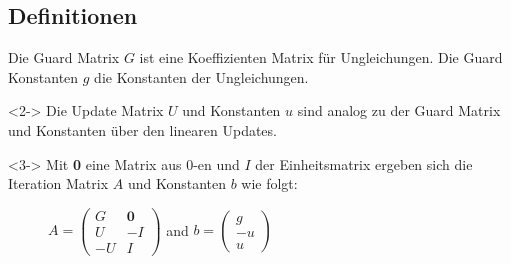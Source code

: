 \subsection{Definitionen}

\begin{frame}
	\begin{definition}
		Die Guard Matrix $G$ ist eine Koeffizienten Matrix f\"ur Ungleichungen. Die Guard Konstanten $g$ die Konstanten der Ungleichungen.
	\end{definition}
	\begin{definition}<2->
		Die Update Matrix $U$ und Konstanten $u$ sind analog zu der Guard Matrix und Konstanten über den linearen Updates.
	\end{definition}
	\begin{definition}<3->
		Mit \textbf{0} eine Matrix aus 0-en und $I$ der Einheitsmatrix ergeben sich die Iteration Matrix $A$ und Konstanten $b$ wie folgt:
		\vspace*{-1em}
		\begin{figure}[H]
			\centering
			$A = \begin{pmatrix} G & \textbf{0} \\ U & -I \\ -U & I \end{pmatrix}$ and $b = \begin{pmatrix} g \\ -u \\ u \end{pmatrix}$
		\end{figure}
	\end{definition}
\end{frame}

